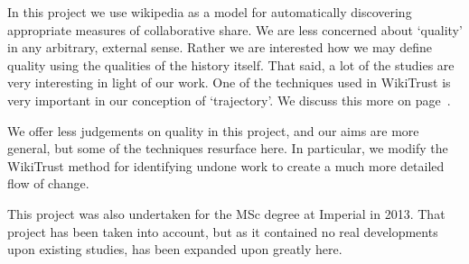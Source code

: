 In this project we use wikipedia as a model for automatically
discovering appropriate measures of collaborative share. We are less
concerned about `quality' in any arbitrary, external sense. Rather we
are interested how we may define quality using the qualities of the
history itself. That said, a lot of the studies are very interesting
in light of our work. One of the techniques used in WikiTrust is very
important in our conception of `trajectory'. We discuss this more on
page~\pageref{sec:wikipedia}.

We offer less judgements on quality in this project, and our aims are
more general, but some of the techniques resurface here. In
particular, we modify the WikiTrust method for identifying undone work
to create a much more detailed flow of change.

This project was also undertaken for the MSc degree at Imperial in
2013. That project has been taken into account, but as it contained no
real developments upon existing studies, has been expanded upon
greatly here.
